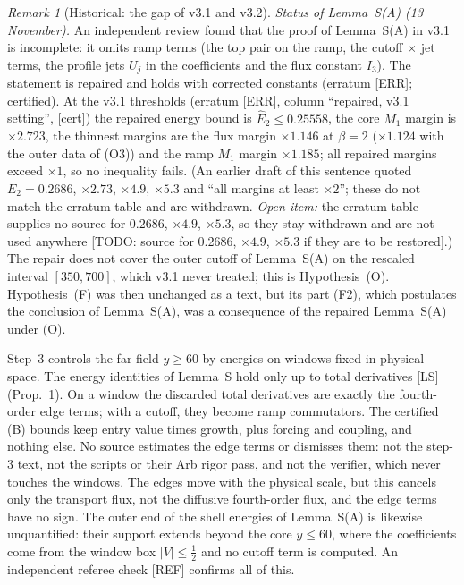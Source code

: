 \documentclass[11pt]{amsart}
\theoremstyle{definition}
\theoremstyle{remark}
\newtheorem{remark}[theorem]{Remark}
\newcommand{\dref}[1]{[\textsf{#1}]}
\begin{document}
\begin{remark}[Historical: the gap of v3.1 and v3.2]
\emph{Status of Lemma~S(A) (13 November).} An independent review found that the proof of Lemma~S(A) in v3.1 is incomplete: it omits ramp terms (the top pair on the ramp, the cutoff $\times$ jet terms, the profile jets $U_j$ in the coefficients and the flux constant $I_3$). The statement is repaired and holds with corrected constants (erratum \dref{ERR}; certified). At the v3.1 thresholds (erratum \dref{ERR}, column ``repaired, v3.1 setting'', \textup{[cert]}) the repaired energy bound is $\hat E_2\le0.25558$, the core $M_1$ margin is $\times2.723$, the thinnest margins are the flux margin $\times1.146$ at $\beta=2$ ($\times1.124$ with the outer data of (O3)) and the ramp $M_1$ margin $\times1.185$; all repaired margins exceed $\times1$, so no inequality fails. (An earlier draft of this sentence quoted $E_2=0.2686$, $\times2.73$, $\times4.9$, $\times5.3$ and ``all margins at least $\times2$''; these do not match the erratum table and are withdrawn. \emph{Open item:} the erratum table supplies no source for $0.2686$, $\times4.9$, $\times5.3$, so they stay withdrawn and are not used anywhere [TODO: source for 0.2686, $\times4.9$, $\times5.3$ if they are to be restored].) The repair does not cover the outer cutoff of Lemma~S(A) on the rescaled interval $[350,700]$, which v3.1 never treated; this is Hypothesis~(O). Hypothesis~(F) was then unchanged as a text, but its part (F2), which postulates the conclusion of Lemma~S(A), was a consequence of the repaired Lemma~S(A) under (O).


Step~3 controls the far field $y\ge60$ by energies on windows fixed in physical space. The energy identities of Lemma~S hold only up to total derivatives \dref{LS} (Prop.~1). On a window the discarded total derivatives are exactly the fourth-order edge terms; with a cutoff, they become ramp commutators. The certified (B) bounds keep entry value times growth, plus forcing and coupling, and nothing else. No source estimates the edge terms or dismisses them: not the step-3 text, not the scripts or their Arb rigor pass, and not the verifier, which never touches the windows. The edges move with the physical scale, but this cancels only the transport flux, not the diffusive fourth-order flux, and the edge terms have no sign. The outer end of the shell energies of Lemma~S(A) is likewise unquantified: their support extends beyond the core $y\le60$, where the coefficients come from the window box $|V|\le\frac12$ and no cutoff term is computed. An independent referee check \dref{REF} confirms all of this.


\end{remark}
\end{document}
